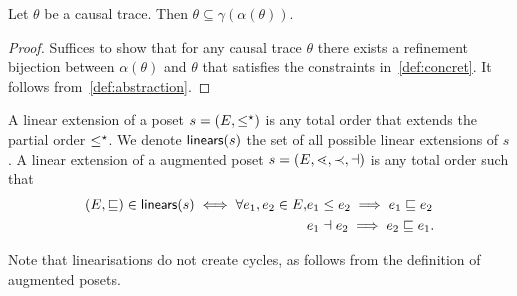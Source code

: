 \begin{theorem}
  Let $\theta$ be a causal trace. Then $\theta\subseteq\gamma(\alpha(\theta))$.
\end{theorem}
\begin{proof}
  Suffices to show that for any causal trace $\theta$ there exists a refinement bijection between $\alpha(\theta)$ and $\theta$ that satisfies the constraints in~\autoref{def:concret}. It follows from~\autoref{def:abstraction}.
\end{proof}


\begin{definition}
  \label{def:linears}
  A linear extension of a poset $s=(E,\leq^{\star})$ is any total order that extends the partial order $\leq^{\star}$. We denote $\mathsf{linears}(s)$ the set of all possible linear extensions of $s$. A linear extension of a augmented poset $s=(E,\lessdot,\prec,\dashv)$ is any total order such that
  \begin{align*}
    (E,\sqsubseteq)\in\mathsf{linears}(s) \iff \forall e_1,e_2\in E, &e_1\leq e_2\implies e_1\sqsubseteq e_2\\
    & e_1\dashv e_2\implies e_2\sqsubseteq e_1.
  \end{align*}
\end{definition}
Note that linearisations do not create cycles, as follows from the definition of augmented posets.

